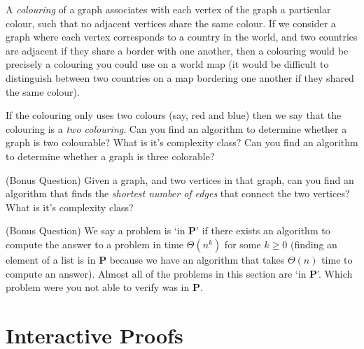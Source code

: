 \documentclass[answers]{exam}
\begin{document}
\begin{questions}
A \emph{colouring} of a graph associates with each vertex of the graph a particular colour, such that no adjacent vertices share the same colour. If we consider a graph where each vertex corresponds to a country in the world, and two countries are adjacent if they share a border with one another, then a colouring would be precisely a colouring you could use on a world map (it would be difficult to distinguish between two countries on a map bordering one another if they shared the same colour).

If the colouring only uses two colours (say, red and blue) then we say that the colouring is a \emph{two colouring}. Can you find an algorithm to determine whether a graph is two colourable? What is it's complexity class? Can you find an algorithm to determine whether a graph is three colorable?

\question (Bonus Question) Given a graph, and two vertices in that graph, can you find an algorithm that finds the \emph{shortest number of edges} that connect the two vertices? What is it's complexity class?

\vspace{3em}

\question (Bonus Question) We say a problem is `in $\mathbf{P}$' if there exists an algorithm to compute the answer to a problem in time $\Theta(n^k)$ for some $k \geq 0$ (finding an element of a list is in $\mathbf{P}$ because we have an algorithm that takes $\Theta(n)$ time to compute an answer). Almost all of the problems in this section are `in $\mathbf{P}$'. Which problem were you not able to verify was in $\mathbf{P}$.

\end{questions}

\section{Interactive Proofs}
\end{document}
